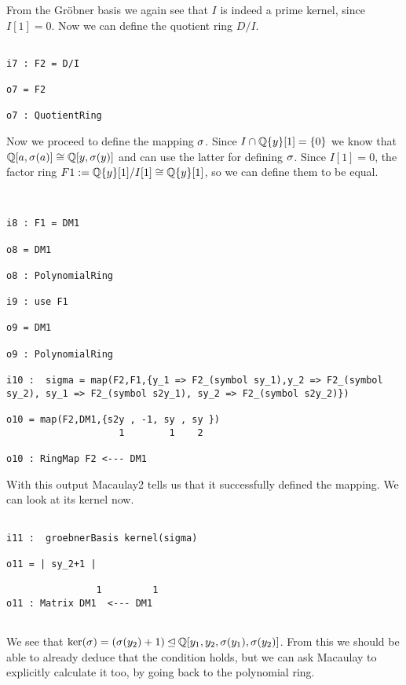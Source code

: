 From the Gr\"{o}bner basis we again see that $I$ is indeed a prime kernel, since $I[1] = 0$.
Now we can define the quotient ring $D/I$.

\begin{lstlisting}

i7 : F2 = D/I

o7 = F2

o7 : QuotientRing

\end{lstlisting}

Now we proceed to define the mapping $\sigma$. Since $I \cap \mathbb{Q}\{y\}[1] = \{ 0 \}$ 
we know that $\mathbb{Q}[a,\sigma(a)] \cong \mathbb{Q}[y,\sigma(y)]$ and can use the latter for defining $\sigma$.
Since $I[1] = 0$, the factor ring $F1 := \mathbb{Q}\{y\}[1]/I[1] \cong \mathbb{Q}\{y\}[1]$, so we can define them to be equal.

\begin{lstlisting}


i8 : F1 = DM1

o8 = DM1

o8 : PolynomialRing

i9 : use F1

o9 = DM1

o9 : PolynomialRing

i10 :  sigma = map(F2,F1,{y_1 => F2_(symbol sy_1),y_2 => F2_(symbol sy_2), sy_1 => F2_(symbol s2y_1), sy_2 => F2_(symbol s2y_2)})

o10 = map(F2,DM1,{s2y , -1, sy , sy })
                    1        1    2

o10 : RingMap F2 <--- DM1

\end{lstlisting}

With this output Macaulay2 tells us that it successfully defined the mapping. We can look at its kernel now.

\begin{lstlisting}

i11 :  groebnerBasis kernel(sigma)

o11 = | sy_2+1 |

                1         1
o11 : Matrix DM1  <--- DM1


\end{lstlisting}


We see that $\ker(\sigma) = (\sigma(y_2) + 1) \unlhd \mathbb{Q}[y_1,y_2, \sigma(y_1), \sigma(y_2)]$. 
From this we should be able to already deduce that the condition holds, but we can ask Macaulay to explicitly
calculate it too, by going back to the polynomial ring. 

